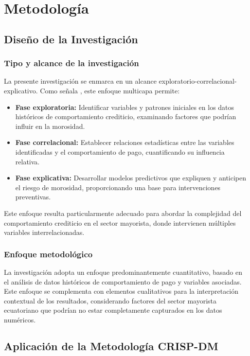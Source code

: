 \chapter{Metodología}

\section{Diseño de la Investigación}
\subsection{Tipo y alcance de la investigación}
La presente investigación se enmarca en un alcance exploratorio-correlacional-explicativo. Como señala \cite{hernandez2020metodologia}, este enfoque multicapa permite:

\begin{itemize}
    \item \textbf{Fase exploratoria:} Identificar variables y patrones iniciales en los datos históricos de comportamiento crediticio, examinando factores que podrían influir en la morosidad.
    \item \textbf{Fase correlacional:} Establecer relaciones estadísticas entre las variables identificadas y el comportamiento de pago, cuantificando su influencia relativa.
    \item \textbf{Fase explicativa:} Desarrollar modelos predictivos que expliquen y anticipen el riesgo de morosidad, proporcionando una base para intervenciones preventivas.
\end{itemize}

Este enfoque resulta particularmente adecuado para abordar la complejidad del comportamiento crediticio en el sector mayorista, donde intervienen múltiples variables interrelacionadas.

\subsection{Enfoque metodológico}
La investigación adopta un enfoque predominantemente cuantitativo, basado en el análisis de datos históricos de comportamiento de pago y variables asociadas. Este enfoque se complementa con elementos cualitativos para la interpretación contextual de los resultados, considerando factores del sector mayorista ecuatoriano que podrían no estar completamente capturados en los datos numéricos.

\section{Aplicación de la Metodología CRISP-DM}
